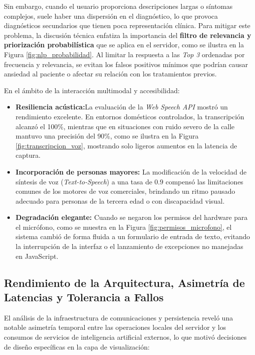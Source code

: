 Sin embargo, cuando el usuario proporciona descripciones largas o síntomas complejos, suele haber una dispersión en el diagnóstico, lo que provoca diagnósticos secundarios que tienen poca representación clínica. Para mitigar este problema, la discusión técnica enfatiza la importancia del \textbf{filtro de relevancia y priorización probabilística} que se aplica en el servidor, como se ilustra en la Figura \ref{fig:nlp_probabilidad}. Al limitar la respuesta a las \emph{Top 3} ordenadas por frecuencia y relevancia, se evitan los falsos positivos mínimos que podrían causar ansiedad al paciente o afectar su relación con los tratamientos previos.

En el ámbito de la interacción multimodal y accesibilidad:
\begin{itemize}
    \item \textbf{Resiliencia acústica:}La evaluación de la \emph{Web Speech API} mostró un rendimiento excelente. En entornos domésticos controlados, la transcripción alcanzó el 100\%, mientras que en situaciones con ruido severo de la calle mantuvo una precisión del 90\%, como se ilustra en la Figura \ref{fig:transcripcion_voz}, mostrando solo ligeros aumentos en la latencia de captura.
    \item \textbf{Incorporación de personas mayores:} La modificación de la velocidad de síntesis de voz (\emph{Text-to-Speech}) a una tasa de $0.9$ compensó las limitaciones comunes de los motores de voz comerciales, brindando un ritmo pausado adecuado para personas de la tercera edad o con discapacidad visual.
    \item \textbf{Degradación elegante:} Cuando se negaron los permisos del hardware para el micrófono, como se muestra en la Figura \ref{fig:permisos_microfono}, el sistema cambió de forma fluida a un formulario de entrada de texto, evitando la interrupción de la interfaz o el lanzamiento de excepciones no manejadas en JavaScript.
\end{itemize}

\subsection{Rendimiento de la Arquitectura, Asimetría de Latencias y Tolerancia a Fallos}
\label{subsec:discusion_arquitectura}

El análisis de la infraestructura de comunicaciones y persistencia reveló una notable asimetría temporal entre las operaciones locales del servidor y los consumos de servicios de inteligencia artificial externos, lo que motivó decisiones de diseño específicas en la capa de visualización:

